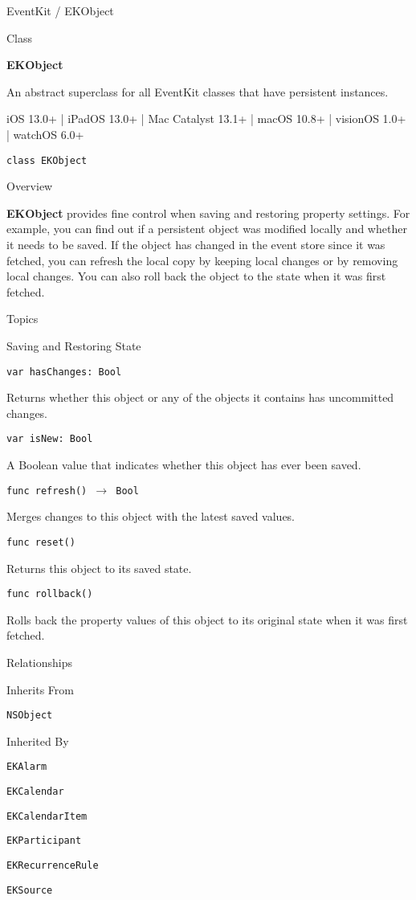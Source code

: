 \documentclass{article}
\title{}
\author{}
\date{}
\begin{document}
EventKit / EKObject

Class

\textbf{EKObject}

An abstract superclass for all EventKit classes that have persistent instances.

iOS 13.0+ | iPadOS 13.0+ | Mac Catalyst 13.1+ | macOS 10.8+ | visionOS 1.0+ | watchOS 6.0+

\texttt{class EKObject}

Overview

\textbf{EKObject} provides fine control when saving and restoring property settings. For example, you can find out if a persistent object was modified locally and whether it needs to be saved. If the object has changed in the event store since it was fetched, you can refresh the local copy by keeping local changes or by removing local changes. You can also roll back the object to the state when it was first fetched.

Topics

Saving and Restoring State

\texttt{var hasChanges: Bool}

Returns whether this object or any of the objects it contains has uncommitted changes.

\texttt{var isNew: Bool}

A Boolean value that indicates whether this object has ever been saved.

\texttt{func refresh() $\rightarrow$ Bool}

Merges changes to this object with the latest saved values.

\texttt{func reset()}

Returns this object to its saved state.

\texttt{func rollback()}

Rolls back the property values of this object to its original state when it was first fetched.

Relationships

Inherits From

\texttt{NSObject}

Inherited By

\texttt{EKAlarm}

\texttt{EKCalendar}

\texttt{EKCalendarItem}

\texttt{EKParticipant}

\texttt{EKRecurrenceRule}

\texttt{EKSource}
\end{document}
